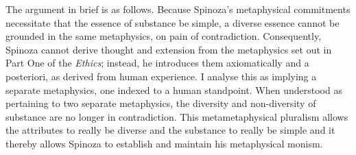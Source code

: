 \documentclass[11pt]{article}
\newcommand{\dash}{\unskip{---}}
\newcommand\texttitle[1]{\emph{#1}}
\begin{document}
	The argument in brief is as follows. Because Spinoza's metaphysical commitments necessitate that the essence of substance be simple, a diverse essence cannot be grounded in the same metaphysics, on pain of contradiction. Consequently, Spinoza cannot derive thought and extension from the metaphysics set out in Part One of the \texttitle{Ethics}; instead, he introduces them axiomatically and a posteriori, as derived from human experience. I analyse this as implying a separate metaphysics, one indexed to a human standpoint. When understood as pertaining to two separate metaphysics, the diversity and non-diversity of substance are no longer in contradiction. This metametaphysical pluralism allows the attributes to really be diverse and the substance to really be simple \dash and it thereby allows Spinoza to establish and maintain his metaphysical monism.
	
	\printshorthands
	\printbibliography[check=shorthands]
\end{document}
